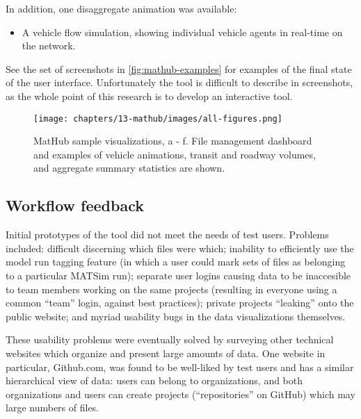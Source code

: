 In addition, one disaggregate animation was available:

\begin{itemize}
\tightlist
\item
  A vehicle flow simulation, showing individual vehicle agents in
  real-time on the network.
\end{itemize}

See the set of screenshots in \autoref{fig:mathub-examples} for examples of the final state of the user interface. Unfortunately the tool is difficult to describe in screenshots, as the whole point of this research is to develop an interactive tool.

\begin{figure}
  \centering
	\begin{minipage}{1.0\textwidth}
  \texttt{[image: chapters/13-mathub/images/all-figures.png]}
  \caption{MatHub sample visualizations, a - f. File management dashboard and examples of vehicle animations, transit and roadway volumes, and aggregate summary statistics are shown.}
  \label{fig:mathub-examples}
	\end{minipage}
\end{figure}

\hypertarget{mathub-workflow-feedback}{%
\subsection{Workflow feedback}\label{workflow-feedback}}

Initial prototypes of the tool did not meet the needs of test users. Problems included: difficult discerning which files were which; inability to efficiently use the model run tagging feature (in which a user could mark sets of files as belonging to a particular MATSim run); separate user logins causing data to be inaccesible to team members working on the same projects (resulting in everyone using a common ``team'' login, against best practices); private projects ``leaking'' onto the public website; and myriad usability bugs in the data visualizations themselves.

These usability problems were eventually solved by surveying other technical websites which organize and present large amounts of data. One website in particular, Github.com, was found to be well-liked by test users and has a similar hierarchical view of data: users can belong to organizations, and both organizations and users can create projects (``repositories'' on GitHub) which may large numbers of files.

